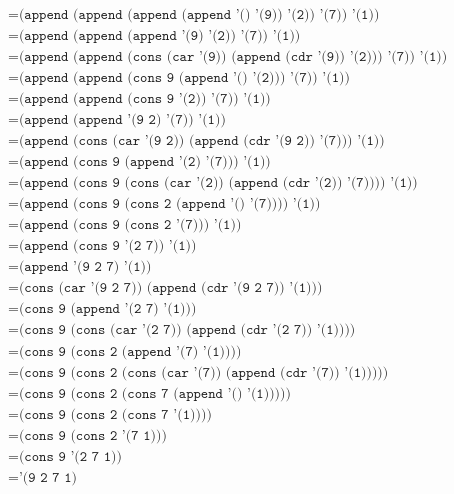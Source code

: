 \documentclass[letterpaper,11pt]{article}
\begin{document}
\begin{enumerate}
\begin{enumerate}
\begin{align*}
            &= \texttt{(append (append (append (append '() '(9)) '(2)) '(7)) '(1))} \\
            &= \texttt{(append (append (append '(9) '(2)) '(7)) '(1))} \\
            &= \texttt{(append (append (cons (car '(9)) (append (cdr '(9)) '(2))) '(7)) '(1))} \\
            &= \texttt{(append (append (cons 9 (append '() '(2))) '(7)) '(1))} \\
            &= \texttt{(append (append (cons 9 '(2)) '(7)) '(1))} \\
            &= \texttt{(append (append '(9 2) '(7)) '(1))} \\
            &= \texttt{(append (cons (car '(9 2)) (append (cdr '(9 2)) '(7))) '(1))} \\
            &= \texttt{(append (cons 9 (append '(2) '(7))) '(1))} \\
            &= \texttt{(append (cons 9 (cons (car '(2)) (append (cdr '(2)) '(7)))) '(1))} \\ 
            &= \texttt{(append (cons 9 (cons 2 (append '() '(7)))) '(1))} \\
            &= \texttt{(append (cons 9 (cons 2 '(7))) '(1))} \\
            &= \texttt{(append (cons 9 '(2 7)) '(1))} \\
            &= \texttt{(append '(9 2 7) '(1))} \\
            &= \texttt{(cons (car '(9 2 7)) (append (cdr '(9 2 7)) '(1)))} \\
            &= \texttt{(cons 9 (append '(2 7) '(1)))} \\
            &= \texttt{(cons 9 (cons (car '(2 7)) (append (cdr '(2 7)) '(1))))} \\
            &= \texttt{(cons 9 (cons 2 (append '(7) '(1))))} \\
            &= \texttt{(cons 9 (cons 2 (cons (car '(7)) (append (cdr '(7)) '(1)))))} \\
            &= \texttt{(cons 9 (cons 2 (cons 7 (append '() '(1)))))} \\
            &= \texttt{(cons 9 (cons 2 (cons 7 '(1))))} \\
            &= \texttt{(cons 9 (cons 2 '(7 1)))} \\
            &= \texttt{(cons 9 '(2 7 1))} \\
            &= \texttt{'(9 2 7 1)}
        \end{align*}


\end{enumerate}
\end{enumerate}
\end{document}

